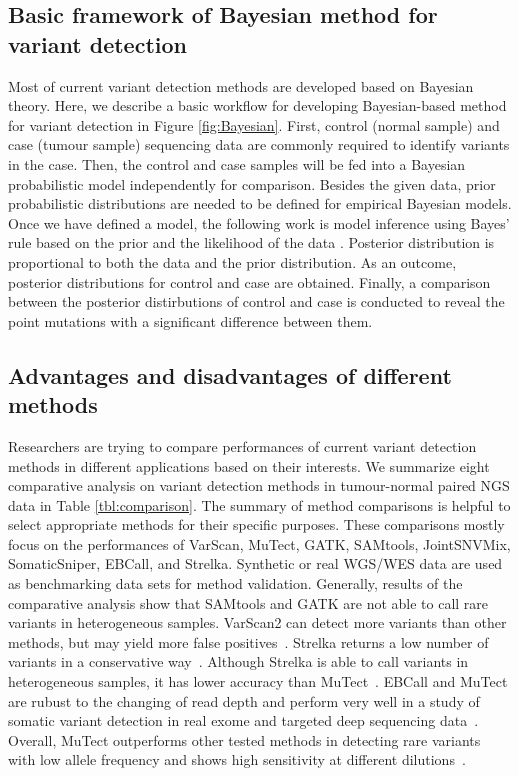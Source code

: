 \documentclass[a4,center,fleqn]{NAR}
\begin{document}
\subsection{Basic framework of Bayesian method for variant detection}

Most of current variant detection methods are developed based on Bayesian theory. 
Here, we describe a basic workflow for developing Bayesian-based method for variant detection in Figure \ref{fig:Bayesian}.
First, control (normal sample) and case (tumour sample) sequencing data are commonly required to identify variants in the case.
Then, the control and case samples will be fed into a Bayesian probabilistic model independently for comparison. 
Besides the given data, prior probabilistic distributions are needed to be defined for empirical Bayesian models.
Once we have defined a model, the following work is model inference using Bayes' rule based on the prior and the likelihood of the data .
Posterior distribution is proportional to both the data and the prior distribution.
As an outcome, posterior distributions for control and case are obtained.
Finally, a comparison between the posterior distirbutions of control and case is conducted to reveal the point mutations with a significant difference between them.




\subsection{Advantages and disadvantages of different methods}

Researchers are trying to compare performances of current variant detection methods in different applications based on their interests.
We summarize eight comparative analysis on variant detection methods in tumour-normal paired NGS data in Table \ref{tbl:comparison}.
The summary of method comparisons is helpful to select appropriate methods for their specific purposes.
These comparisons mostly focus on the performances of VarScan, MuTect, GATK, SAMtools, JointSNVMix, SomaticSniper, EBCall, and Strelka.
Synthetic or real WGS/WES data are used as benchmarking data sets for method validation.
Generally, results of the comparative analysis show that SAMtools and GATK are not able to call rare variants in heterogeneous samples.
VarScan2 can detect more variants than other methods, but may yield more false positives~\citep{wang2013detecting, Spencer2014}.
Strelka returns a low number of variants in a conservative way~\citep{kroigaard2016evaluation}.
Although Strelka is able to call variants in heterogeneous samples, it has lower accuracy than MuTect~\citep{wang2013detecting}.
EBCall and MuTect are rubust to the changing of read depth and perform very well in a study of somatic variant detection in real exome and targeted deep sequencing data~\citep{kroigaard2016evaluation}.
Overall, MuTect outperforms other tested methods in detecting rare variants with low allele frequency and shows high sensitivity at different dilutions~\citep{wang2013detecting, Xu2014}.
\end{document}

